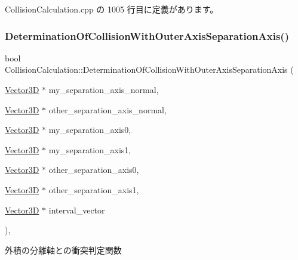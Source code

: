  Collision\+Calculation.\+cpp の 1005 行目に定義があります。

\mbox{\label{class_collision_calculation_a7ad238e8d35646bf4034879204d94533}} 
\subsubsection{\texorpdfstring{Determination\+Of\+Collision\+With\+Outer\+Axis\+Separation\+Axis()}{DeterminationOfCollisionWithOuterAxisSeparationAxis()}}
{\footnotesize\ttfamily bool Collision\+Calculation\+::\+Determination\+Of\+Collision\+With\+Outer\+Axis\+Separation\+Axis (\begin{DoxyParamCaption}\item[{\mbox{\hyperlink{class_vector3_d}{Vector3D}} $\ast$}]{my\+\_\+separation\+\_\+axis\+\_\+normal,  }\item[{\mbox{\hyperlink{class_vector3_d}{Vector3D}} $\ast$}]{other\+\_\+separation\+\_\+axis\+\_\+normal,  }\item[{\mbox{\hyperlink{class_vector3_d}{Vector3D}} $\ast$}]{my\+\_\+separation\+\_\+axis0,  }\item[{\mbox{\hyperlink{class_vector3_d}{Vector3D}} $\ast$}]{my\+\_\+separation\+\_\+axis1,  }\item[{\mbox{\hyperlink{class_vector3_d}{Vector3D}} $\ast$}]{other\+\_\+separation\+\_\+axis0,  }\item[{\mbox{\hyperlink{class_vector3_d}{Vector3D}} $\ast$}]{other\+\_\+separation\+\_\+axis1,  }\item[{\mbox{\hyperlink{class_vector3_d}{Vector3D}} $\ast$}]{interval\+\_\+vector }\end{DoxyParamCaption})\hspace{0.3cm}{\ttfamily [static]}, {\ttfamily [private]}}



外積の分離軸との衝突判定関数 


